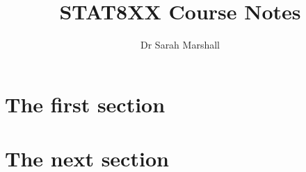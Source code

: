 \documentclass[a4paper]{article}
\title{STAT8XX Course Notes}
\author{Dr Sarah Marshall}
\begin{document}
\maketitle

\newpage

\tableofcontents

\newpage
\section{The first section}
\section{The next section}
\end{document}
